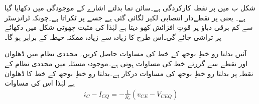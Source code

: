 شکل  ب میں  پر  نقطہ کارکردگی ہے۔سائن نما بدلتے اشارے کے موجودگی میں  دکھایا گیا ہے۔ یعنی  پر نقطےدار انتصابی لکیر لگائی گئی ہے جسے    پر ٹکراتا ہے۔چونکہ ٹرانزسٹر  سے کم برقی دباؤ پر قوتِ افزائش کھو دیتا ہے لہٰذا  کی مثبت چھوٹی شکل میں دکھائے  پر تراشی جائے گی۔اس طرح  کا زیادہ سے زیادہ ممکنہ حیطہ  کے برابر ہو گا۔

آئیں بدلتا رو خطِ بوجھ کے خط کی مساوات حاصل کریں۔ محددی نظام   میں  ڈھلوان اور نقطے سے گزرتے خط کی مساوات  ہوتی ہے۔موجودہ مسئلہ میں  محددی نظام  کے نقطہ پر بدلتا رو خطِ بوجھ کی مساوات درکار ہے۔بدلتا رو خطِ بوجھ کے خط کا ڈھلوان  ہے لہٰذا اس کی مساوات
\begin{align}\label{مساوات_ٹرانزسٹر_بدلتا_بار_خط_مساوات}
i_C-I_{CQ}=-\frac{1}{R_c} \left(v_{CE}-V_{CEQ} \right)
\end{align} 

